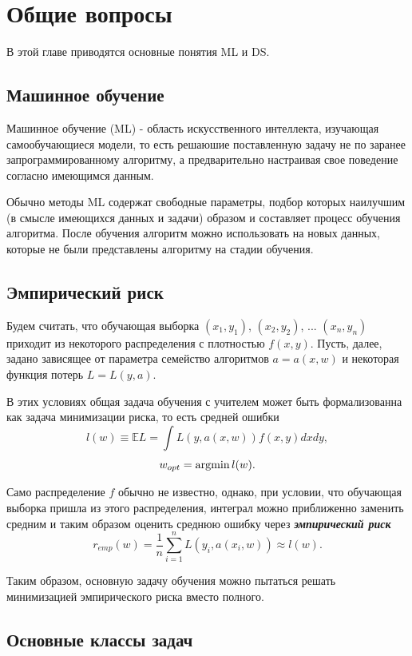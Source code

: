 \chapter{Общие вопросы}

В этой главе приводятся основные понятия ML и DS. 


\section{Машинное обучение}

Машинное обучение (ML) - область искусственного интеллекта, изучающая самообучающиеся модели, то есть решаюшие поставленную задачу не по заранее запрограммированному алгоритму, а предварительно настраивая свое поведение согласно имеющимся данным. 

Обычно методы ML содержат свободные параметры, подбор которых наилучшим (в смысле имеющихся данных и задачи) образом и составляет процесс обучения алгоритма. После обучения алгоритм можно использовать на новых данных, которые не были представлены алгоритму на стадии обучения.


\section{Эмпирический риск}

Будем считать, что обучающая выборка $(x_1, y_1)$, $(x_2, y_2)$, ... $(x_n, y_n)$ приходит из некоторого распределения с плотностью $f(x, y)$.
Пусть, далее, задано зависящее от параметра семейство алгоритмов $a = a(x, w)$ и некоторая функция потерь $L = L(y, a)$.

В этих условиях общая задача обучения с учителем может быть формализованна как задача минимизации риска, то есть средней ошибки
$$
l(w) \equiv \mathbb{E}L = \int L(y, a(x, w))f(x, y)dxdy,
$$
$$
w_{opt} = \operatorname*{argmin} l(w).
$$

Само распределение $f$ обычно не известно, однако, при условии, что обучающая выборка пришла из этого распределения, интеграл можно приближенно заменить  средним и таким образом оценить среднюю ошибку через \textbf{\textit{эмпирический риск}}
$$
r_{emp}(w) = \frac{1}{n}\sum_{i=1}^nL(y_i, a(x_i, w)) \approx l(w).
$$

Таким образом, основную задачу обучения можно пытаться решать минимизацией эмпирического риска вместо полного.


\section{Основные классы задач}

